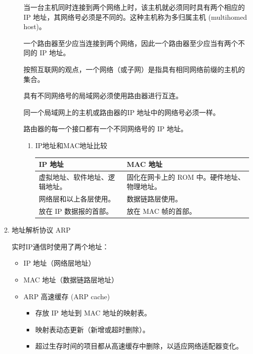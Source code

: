 \documentclass[11pt]{article}
\begin{document}
\begin{enumerate}
\begin{enumerate}
当一台主机同时连接到两个网络上时，该主机就必须同时具有两个相应的 IP 地址，其网络号必须是不同的。这种主机称为多归属主机 (multihomed host)。

一个路由器至少应当连接到两个网络，因此一个路由器至少应当有两个不同的 IP 地址。

按照互联网的观点，一个网络（或子网）是指具有相同网络前缀的主机的集合。

具有不同网络号的局域网必须使用路由器进行互连。

同一个局域网上的主机或路由器的IP 地址中的网络号必须一样。

路由器的每一个接口都有一个不同网络号的 IP 地址。

\begin{enumerate}
\item IP地址和MAC地址比较
\label{sec:orgcedc425}
\begin{center}
\begin{tabular}{ll}
IP 地址 & MAC 地址\\[0pt]
\hline
虚拟地址、软件地址、逻辑地址。 & 固化在网卡上的 ROM 中。硬件地址、物理地址。\\[0pt]
网络层和以上各层使用。 & 数据链路层使用。\\[0pt]
放在 IP 数据报的首部。 & 放在 MAC 帧的首部。\\[0pt]
\end{tabular}
\end{center}
\end{enumerate}
\end{enumerate}

\item 地址解析协议 ARP
\label{sec:org307d138}

实时IP通信时使用了两个地址：
\begin{itemize}
\item IP 地址（网络层地址）
\item MAC 地址（数据链路层地址）
\end{itemize}


\begin{itemize}
\item ARP 高速缓存 (ARP cache)

\begin{itemize}
\item 存放 IP 地址到 MAC 地址的映射表。

\item 映射表动态更新（新增或超时删除）。

\item 超过生存时间的项目都从高速缓存中删除，以适应网络适配器变化。
\end{itemize}


\end{itemize}
\end{enumerate}
\end{document}
